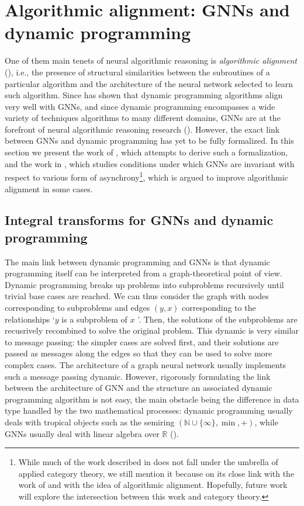 \documentclass[11pt,a4paper,openright,twoside]{report}
\theoremstyle{plain}
\theoremstyle{definition}
\begin{document}
\section{Algorithmic alignment: GNNs and dynamic programming}


One of them main tenets of neural algorithmic reasoning is \textit{algorithmic alignment} (\cite{xu2019can}), i.e., the presence of structural similarities between the subroutines of a particular algorithm and the architecture of the neural network selected to learn such algorithm.
Since \cite{xu2019can} has shown that dynamic programming algorithms align very well with GNNs, and since dynamic programming encompasses a wide variety of techniques algorithms to many different domains, GNNs  are at the forefront of neural algorithmic reasoning research (\cite{dudzik2022graph}). However, the exact link between GNNs and dynamic programming has yet to be fully formalized. In this section we present the work of \cite{dudzik2022graph}, which attempts to derive such a formalization, and the work in \cite{dudzik2024asynchronous}, which studies conditions under which GNNs are invariant with respect to various form of asynchrony\footnote{While much of the work described in \cite{dudzik2024asynchronous} does not fall under the umbrella of applied category theory, we still mention it because on its close link with the work of \cite{dudzik2022graph} and with the idea of algorithmic alignment. Hopefully, future work will explore the intersection between this work and category theory.}, which is argued to improve algorithmic alignment in some cases.


\subsection{Integral transforms for GNNs and dynamic programming}

The main link between dynamic programming and GNNs is that dynamic programming itself can be interpreted from a graph-theoretical point of view. Dynamic programming breaks up problems into subproblems recursively until trivial base cases are reached. We can thus consider the graph with nodes corresponding to subproblems and edges $(y,x)$ corresponding to the relationships \lq $y$ is a subproblem of $x$ \rq. Then, the solutions of the subproblems are recusrively recombined to solve the original problem. This dynamic is very similar to message passing: the simpler cases are solved first, and their solutions are passed as messages along the edges so that they can be used to solve more complex cases. The architecture of a graph neural network usually implements such a message passing dynamic. However, rigorously formulating the link between the architecture of GNN and the structure an associated dynamic programming algorithm is not easy, the main obstacle being the difference in data type handled by the two mathematical processes: dynamic programming usually deals with tropical objects such as the semiring $(\mathbb{N} \cup \{\infty\}, \min, +)$, while GNNs usually deal with linear algebra over $\mathbb{R}$ (\cite{dudzik2022graph}).
\end{document}
